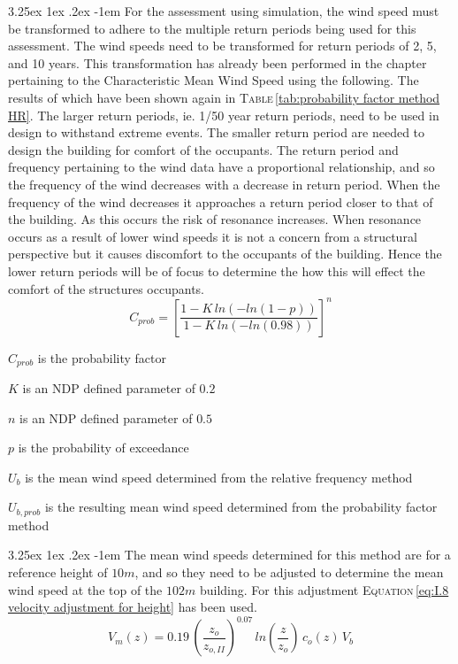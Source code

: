 \documentclass[11pt,a4paper,titlepage]{report}
\makeatletter
\renewcommand\paragraph{\@startsection{paragraph}{5}{\z@}%
  {3.25ex \@plus1ex \@minus.2ex}%
  {-1em}%
  {\normalfont\normalsize\bfseries}}
\makeatother
\begin{document}
\paragraph{}For the assessment using simulation, the wind speed must be transformed to adhere to the multiple return periods being used for this assessment. The wind speeds need to be transformed for return periods of 2, 5, and 10 years. This transformation has already been performed in the chapter pertaining to the Characteristic Mean Wind Speed using the following. The results of which have been shown again in \textsc{Table}\,\ref{tab:probability factor method HR}. The larger return periods, ie. 1/50 year return periods, need to be used in design to withstand extreme events. The smaller return period are needed to design the building for comfort of the occupants. The return period and frequency pertaining to the wind data have a proportional relationship, and so the frequency of the wind decreases with a decrease in return period. When the frequency of the wind decreases it approaches a return period closer to that of the building. As this occurs the risk of resonance increases. When resonance occurs as a result of lower wind speeds it is not a concern from a structural perspective but it causes discomfort to the occupants of the building. Hence the lower return periods will be of focus to determine the how this will effect the comfort of the structures occupants. 
\begin{equation}
    C_{prob}=\left[\dfrac{1-K\,ln(-ln(1-p))}{1-K\,ln(-ln(0.98))}\right]^n
    \label{eq:I.6: probability factor HR}
\end{equation}
\begin{itemize}
    \begin{small}
    \item $C_{prob}$ is the probability factor 
    \item $K$ is an NDP defined parameter of $0.2$
    \item $n$ is an NDP defined parameter of $0.5$
    \item $p$ is the probability of exceedance
    \item $U_b$ is the mean wind speed determined from the relative frequency method
    \item $U_{b,prob}$ is the resulting mean wind speed determined from the probability factor method
    \end{small}
\end{itemize}
\paragraph{}The mean wind speeds determined for this method are for a reference height of $10m$, and so they need to be adjusted to determine the mean wind speed at the top of the $102m$ building. For this adjustment \textsc{Equation}\,\eqref{eq:I.8 velocity adjustment for height} has been used.
\begin{equation}
    V_m(z)=0.19\,\left(\dfrac{z_o}{z_{o,II}}\right)^{0.07}\,ln\left(\dfrac{z}{z_o}\right)\,c_o(z)\,V_b
    \label{eq:I.8 velocity adjustment for height}
\end{equation}
\end{document}
